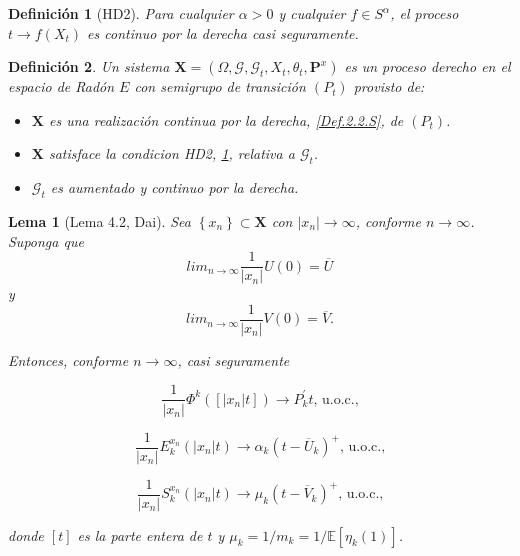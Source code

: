\documentclass{article}
\newtheorem{Def}{Definición}
\newtheorem{Lema}{Lema}
\newcommand{\esp}{\mathbb{E}}
\newcommand{\SG}{\left(P_{t}\right)}
\newcommand{\CM}{\mathbf{P}^{x}}
\begin{document}
\begin{Def}[HD2]\label{Eq.2.2.S}
Para cualquier $\alpha>0$ y cualquier $f\in S^{\alpha}$, el
proceso $t\rightarrow f\left(X_{t}\right)$ es continuo por la
derecha casi seguramente.
\end{Def}

\begin{Def}\label{Def.PD}
Un sistema
$\mathbf{X}=\left(\Omega,\mathcal{G},\mathcal{G}_{t},X_{t},\theta_{t},\CM\right)$
es un proceso derecho en el espacio de Rad\'on $E$ con semigrupo
de transici\'on $\SG$ provisto de:
\begin{itemize}
\item[i)] $\mathbf{X}$ es una realizaci\'on  continua por la
derecha, \ref{Def.2.2.S}, de $\SG$.

\item[ii)] $\mathbf{X}$ satisface la condicion HD2,
\ref{Eq.2.2.S}, relativa a $\mathcal{G}_{t}$.

\item[iii)] $\mathcal{G}_{t}$ es aumentado y continuo por la
derecha.
\end{itemize}
\end{Def}

\begin{Lema}[Lema 4.2, Dai\cite{Dai}]\label{Lema4.2}
Sea $\left\{x_{n}\right\}\subset \mathbf{X}$ con
$|x_{n}|\rightarrow\infty$, conforme $n\rightarrow\infty$. Suponga
que
\[lim_{n\rightarrow\infty}\frac{1}{|x_{n}|}U\left(0\right)=\overline{U}\]
y
\[lim_{n\rightarrow\infty}\frac{1}{|x_{n}|}V\left(0\right)=\overline{V}.\]

Entonces, conforme $n\rightarrow\infty$, casi seguramente

\begin{equation}\label{E1.4.2}
\frac{1}{|x_{n}|}\Phi^{k}\left(\left[|x_{n}|t\right]\right)\rightarrow
P_{k}^{'}t\textrm{, u.o.c.,}
\end{equation}

\begin{equation}\label{E1.4.3}
\frac{1}{|x_{n}|}E^{x_{n}}_{k}\left(|x_{n}|t\right)\rightarrow
\alpha_{k}\left(t-\overline{U}_{k}\right)^{+}\textrm{, u.o.c.,}
\end{equation}

\begin{equation}\label{E1.4.4}
\frac{1}{|x_{n}|}S^{x_{n}}_{k}\left(|x_{n}|t\right)\rightarrow
\mu_{k}\left(t-\overline{V}_{k}\right)^{+}\textrm{, u.o.c.,}
\end{equation}

donde $\left[t\right]$ es la parte entera de $t$ y
$\mu_{k}=1/m_{k}=1/\esp\left[\eta_{k}\left(1\right)\right]$.
\end{Lema}
\end{document}
